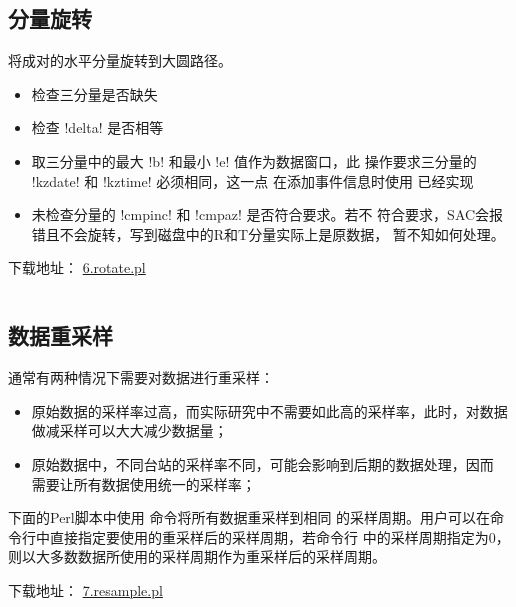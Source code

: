 \subsection{分量旋转}
\label{subsec:rotate-perl}
将成对的水平分量旋转到大圆路径。
\begin{itemize}
\item 检查三分量是否缺失
\item 检查 !delta! 是否相等
\item 取三分量中的最大 !b! 和最小 !e! 值作为数据窗口，此
    操作要求三分量的 !kzdate! 和 !kztime! 必须相同，这一点
    在添加事件信息时使用  已经实现
\item 未检查分量的 !cmpinc! 和 !cmpaz! 是否符合要求。若不
    符合要求，SAC会报错且不会旋转，写到磁盘中的R和T分量实际上是原数据，
    暂不知如何处理。
\end{itemize}

下载地址： \href{https://raw.githubusercontent.com/seisman/SAC_Docs_zh/master/call-in-script/6.rotate.pl}{6.rotate.pl}
\inputminted{perl}{./call-in-script/6.rotate.pl}

\subsection{数据重采样}
\label{subsec:resample-perl}
通常有两种情况下需要对数据进行重采样：
\begin{itemize}
\item 原始数据的采样率过高，而实际研究中不需要如此高的采样率，此时，对数据
    做减采样可以大大减少数据量；
\item 原始数据中，不同台站的采样率不同，可能会影响到后期的数据处理，因而
    需要让所有数据使用统一的采样率；
\end{itemize}
下面的Perl脚本中使用  命令将所有数据重采样到相同
的采样周期。用户可以在命令行中直接指定要使用的重采样后的采样周期，若命令行
中的采样周期指定为0，则以大多数数据所使用的采样周期作为重采样后的采样周期。

下载地址： \href{https://raw.githubusercontent.com/seisman/SAC_Docs_zh/master/call-in-script/7.resample.pl}{7.resample.pl}
\inputminted{perl}{./call-in-script/7.resample.pl}

